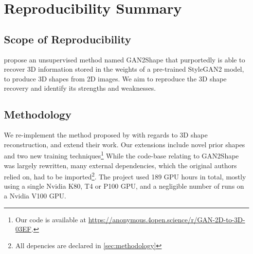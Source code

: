 \section*{\centering Reproducibility Summary}


\subsection*{Scope of Reproducibility}


\cite{gan2shape} propose an unsupervised method named GAN2Shape that purportedly is able to recover 3D information stored in the weights of a pre-trained StyleGAN2 model, to produce 3D shapes from 2D images. We aim to reproduce the 3D shape recovery and identify its strengths and weaknesses.

\subsection*{Methodology}


We re-implement the method proposed by \cite{gan2shape} with regards to 3D shape reconstruction, and extend their work. Our extensions include novel prior shapes and two new training techniques\footnote{Our code is available at \url{https://anonymous.4open.science/r/GAN-2D-to-3D-03EF}.} While the code-base relating to GAN2Shape was largely rewritten, many external dependencies, which the original authors relied on, had to be imported\footnote{All depencies are declared in \autoref{sec:methodology}}. The project used 189 GPU hours in total, mostly using a single Nvidia K80, T4 or P100 GPU, and a negligible number of runs on a Nvidia V100 GPU.

